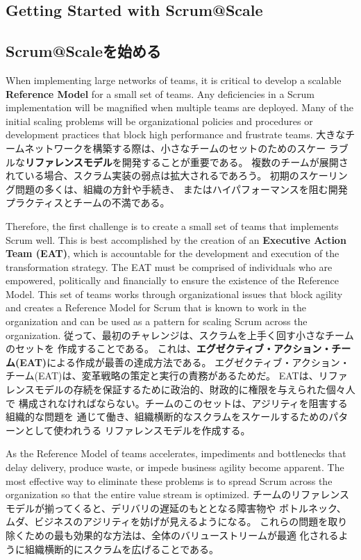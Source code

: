 \documentclass[12pt,a4paper,parskip=full]{scrartcl}
\begin{document}
\subsection{Getting Started with Scrum@Scale}
\fi
\subsection{Scrum@Scaleを始める}
When implementing large networks of teams, it is critical to develop a
scalable \textbf{Reference Model} for a small set of teams. Any
deficiencies in a Scrum implementation will be magnified when multiple
teams are deployed. Many of the initial scaling problems will be organizational 
policies and procedures or development practices that block high performance and frustrate 
teams. 
\fi
大きなチームネットワークを構築する際は、小さなチームのセットのためのスケー
ラブルな\textbf{リファレンスモデル}を開発することが重要である。
複数のチームが展開されている場合、スクラム実装の弱点は拡大されるであろう。
初期のスケーリング問題の多くは、組織の方針や手続き、
またはハイパフォーマンスを阻む開発プラクティスとチームの不満である。

Therefore, the first challenge is to create a small set of teams that
implements Scrum well.  This is best accomplished by the creation of an 
\textbf{Executive Action Team (EAT)}, which is accountable for the development and 
execution of the transformation strategy.  The EAT must be comprised of individuals 
who are empowered, politically and financially to ensure the existence of the
Reference Model.  This set of teams works through organizational
issues that block agility and creates a Reference Model for Scrum that is
known to work in the organization and can be used as a pattern for scaling
Scrum across the organization.
\fi
従って、最初のチャレンジは、スクラムを上手く回す小さなチームのセットを
作成することである。
これは、\textbf{エグゼクティブ・アクション・チーム(EAT)}による作成が最善の達成方法である。
エグゼクティブ・アクション・チーム(EAT)は、変革戦略の策定と実行の責務があるためだ。
EATは、リファレンスモデルの存続を保証するために政治的、財政的に権限を与えられた個々人で
構成されなければならない。チームのこのセットは、アジリティを阻害する組織的な問題を
通じて働き、組織横断的なスクラムをスケールするためのパターンとして使われうる
リファレンスモデルを作成する。

As the Reference Model of teams accelerates, impediments and bottlenecks
that delay delivery, produce waste, or impede business agility become
apparent. The most effective way to eliminate these problems is to spread
Scrum across the organization so that the entire value stream is optimized.
\fi
チームのリファレンスモデルが揃ってくると、デリバリの遅延のもととなる障害物や
ボトルネック、ムダ、ビジネスのアジリティを妨げが見えるようになる。
これらの問題を取り除くための最も効果的な方法は、全体のバリューストリームが最適
化されるように組織横断的にスクラムを広げることである。
\end{document}

